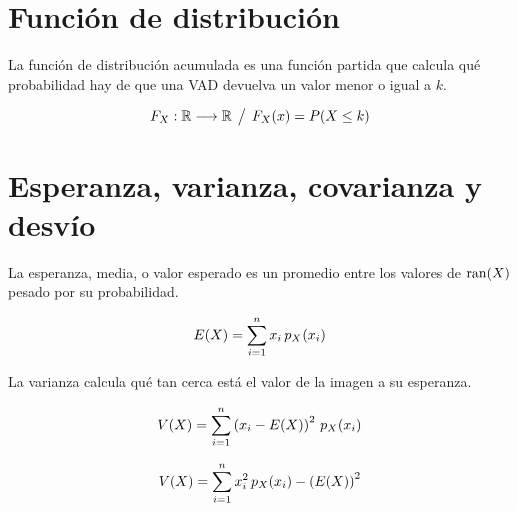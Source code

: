 \section{Función de distribución}

La función de distribución acumulada es una función partida que calcula qué probabilidad hay de que una VAD devuelva un valor menor o igual a $k$.

\begin{mdframed}[style=DefinitionFrame]
    \begin{defn}
    \end{defn}
    \begin{equation*}
        F_X: \setR \longrightarrow \setR \tq F_X(x) = P(X \leq k)
    \end{equation*}
\end{mdframed}


\section{Esperanza, varianza, covarianza y desvío}

La esperanza, media, o valor esperado es un promedio entre los valores de $\ran(X)$ pesado por su probabilidad.

\begin{mdframed}[style=DefinitionFrame]
    \begin{defn}
    \end{defn}
    \begin{equation*}
        E(X) = \sum_{i=1}^n x_i \, \fx[p_X]{x_i}
    \end{equation*}
\end{mdframed}

La varianza calcula qué tan cerca está el valor de la imagen a su esperanza.

\begin{mdframed}[style=DefinitionFrame]
    \begin{defn}
    \end{defn}
    \begin{equation*}
        V(X) = \sum_{i=1}^n \inParentheses{x_i - E(X)}^2 \, p_X(x_i)
    \end{equation*}
\end{mdframed}

\begin{mdframed}[style=PropertyFrame]
    \begin{prop}
    \end{prop}
    \begin{equation*}
        V(X) = \sum_{i=1}^n x_i^2 \, p_X(x_i) - \inParentheses{E(X)}^2
    \end{equation*}
\end{mdframed}

